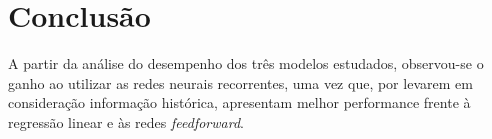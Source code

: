 
\chapter{Conclusão}
\label{chap:conclusao}

A partir da análise do desempenho dos três modelos estudados,
 observou-se o ganho ao utilizar as redes neurais recorrentes,
  uma vez que, por levarem em consideração informação 
  histórica, apresentam melhor performance frente à 
  regressão linear e às redes \textit{feedforward}.
